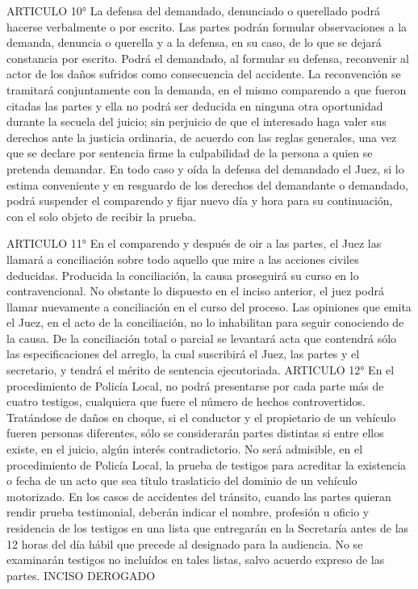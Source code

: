     ARTICULO 10° La defensa del demandado, denunciado o querellado podrá hacerse verbalmente o por escrito. Las partes podrán formular observaciones a la demanda, denuncia o querella y a la defensa, en su caso, de lo que se dejará constancia por escrito.
    Podrá el demandado, al formular su defensa, reconvenir al actor de los daños sufridos como consecuencia del accidente. La reconvención se tramitará conjuntamente con la demanda, en el mismo comparendo a que fueron citadas las partes y ella no podrá ser deducida en ninguna otra oportunidad durante la secuela del juicio; sin perjuicio de que el interesado haga valer sus derechos ante la justicia ordinaria, de acuerdo con las reglas generales, una vez que se declare por sentencia firme la culpabilidad de la persona a quien se pretenda demandar.
    En todo caso y oída la defensa del demandado el Juez, si lo estima conveniente y en resguardo de los derechos del demandante o demandado, podrá suspender el comparendo y fijar nuevo día y hora para su continuación, con el solo objeto de recibir la prueba.

    ARTICULO 11° En el comparendo y después de oir a las partes, el Juez las llamará a conciliación sobre todo aquello que mire a las acciones civiles deducidas. Producida la conciliación, la causa proseguirá su curso en lo contravencional.
    No obstante lo dispuesto en el inciso anterior, el juez podrá llamar nuevamente a conciliación en el curso del proceso. Las opiniones que emita el Juez, en el acto de la conciliación, no lo inhabilitan para seguir conociendo de la causa.
    De la conciliación total o parcial se levantará acta que contendrá sólo las especificaciones del arreglo, la cual suscribirá el Juez, las partes y el secretario, y tendrá el mérito de sentencia ejecutoriada.
    ARTICULO 12° En el procedimiento de Policía Local, no podrá presentarse por cada parte más de cuatro testigos, cualquiera que fuere el número de hechos controvertidos. Tratándose de daños en choque, si el conductor y el propietario de un vehículo fueren personas diferentes, sólo se considerarán partes distintas si entre ellos existe, en el juicio, algún interés contradictorio.
    No será admisible, en el procedimiento de Policía Local, la prueba de testigos para acreditar la existencia o fecha de un acto que sea título traslaticio del dominio de un vehículo motorizado.
    En los casos de accidentes del tránsito, cuando las partes quieran rendir prueba testimonial, deberán indicar el nombre, profesión u oficio y residencia de los testigos en una lista que entregarán en la Secretaría antes de las 12 horas del día hábil que precede al designado para la audiencia. No se examinarán testigos no incluídos en tales listas, salvo acuerdo expreso de las partes.
    INCISO DEROGADO



